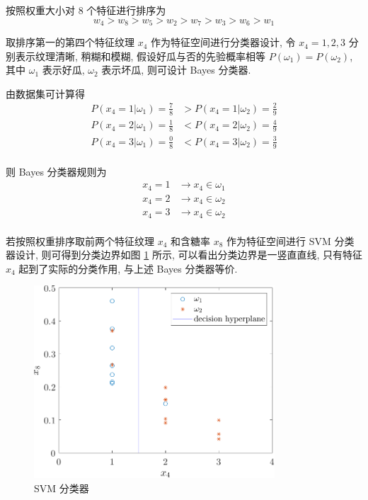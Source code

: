 \documentclass{article}
\begin{document}
按照权重大小对 8 个特征进行排序为
\begin{equation}
  w_4>w_8>w_5>w_2>w_7>w_3>w_6>w_1
\end{equation}

取排序第一的第四个特征纹理 $x_4$ 作为特征空间进行分类器设计, 令 $x_4=1,2,3$ 分别表示纹理清晰, 稍糊和模糊, 假设好瓜与否的先验概率相等 $P(\omega_1)=P(\omega_2)$, 其中 $\omega_1$ 表示好瓜, $\omega_2$ 表示坏瓜, 则可设计 Bayes 分类器.

由数据集可计算得
\begin{equation}
  \begin{aligned}
    P(x_4=1|\omega_1)=\frac{7}{8}&>P(x_4=1|\omega_2)=\frac{2}{9}\\
    P(x_4=2|\omega_1)=\frac{1}{8}&<P(x_4=2|\omega_2)=\frac{4}{9}\\
    P(x_4=3|\omega_1)=\frac{0}{8}&<P(x_4=3|\omega_2)=\frac{3}{9}\\
  \end{aligned}
\end{equation}

则 Bayes 分类器规则为
\begin{equation}
  \begin{aligned}
    x_4=1&\to x_4\in\omega_1\\
    x_4=2&\to x_4\in\omega_2\\
    x_4=3&\to x_4\in\omega_2\\
  \end{aligned}
\end{equation}

若按照权重排序取前两个特征纹理 $x_4$ 和含糖率 $x_8$ 作为特征空间进行 SVM 分类器设计, 则可得到分类边界如图 \ref{fig:featureSVM} 所示, 可以看出分类边界是一竖直直线, 只有特征 $x_4$ 起到了实际的分类作用, 与上述 Bayes 分类器等价.

\begin{figure}[htbp]
  \centering
  \includegraphics[width=9cm]{featureSVM.pdf}
  \caption{SVM 分类器}
  \label{fig:featureSVM}
\end{figure}
\end{document}
